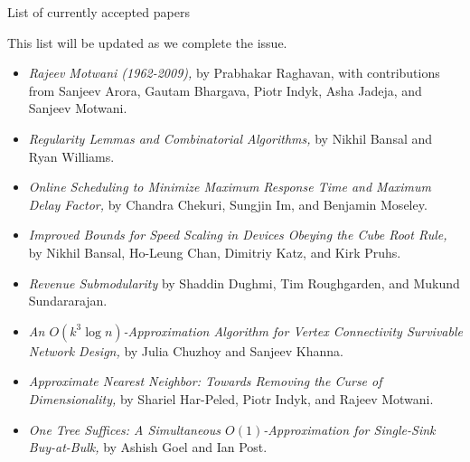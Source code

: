 \documentclass{tocforeword}
\newcommand{\eat}[1]{}
\begin{document}
\newpage

\noindent
{\Large List of currently accepted papers}

\smallskip\noindent
This list will be updated as we complete the issue.


\begin{itemize}
\item \emph{Rajeev Motwani (1962-2009),} by Prabhakar Raghavan, with
contributions from Sanjeev Arora, Gautam Bhargava, Piotr Indyk, Asha Jadeja, 
and Sanjeev Motwani.

\item  \emph{Regularity Lemmas and Combinatorial Algorithms,}
 by Nikhil Bansal and Ryan Williams.

\item \emph{Online Scheduling to Minimize Maximum Response Time and 
Maximum Delay Factor,} by Chandra Chekuri, Sungjin Im, and Benjamin Moseley. 

\item \emph{Improved Bounds for Speed Scaling in Devices Obeying the 
Cube Root Rule,} 
by Nikhil Bansal, Ho-Leung Chan, Dimitriy Katz, and Kirk Pruhs.

\item \emph{Revenue Submodularity} by Shaddin Dughmi, Tim Roughgarden, and 
Mukund Sundararajan.

\item \emph{An $O(k^3 \log n)$-Approximation Algorithm for Vertex Connectivity
Survivable Network Design,} by Julia Chuzhoy and Sanjeev Khanna.


\item \emph{ Approximate Nearest Neighbor: Towards Removing the Curse of 
Dimensionality,} by Shariel Har-Peled, Piotr Indyk, and Rajeev Motwani.

\item \emph{One Tree Suffices: A Simultaneous $O(1)$-Approximation for 
Single-Sink Buy-at-Bulk,} by Ashish Goel and Ian Post.

\end{itemize}


  

\end{document}
